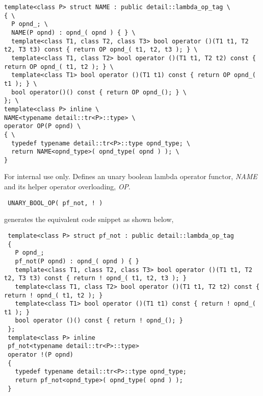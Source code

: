 \begin{Code}\begin{verbatim}template<class P> struct NAME : public detail::lambda_op_tag \
{ \
  P opnd_; \
  NAME(P opnd) : opnd_( opnd ) { } \
  template<class T1, class T2, class T3> bool operator ()(T1 t1, T2 t2, T3 t3) const { return OP opnd_( t1, t2, t3 ); } \
  template<class T1, class T2> bool operator ()(T1 t1, T2 t2) const { return OP opnd_( t1, t2 ); } \
  template<class T1> bool operator ()(T1 t1) const { return OP opnd_( t1 ); } \
  bool operator()() const { return OP opnd_(); } \
}; \
template<class P> inline \
NAME<typename detail::tr<P>::type> \
operator OP(P opnd) \
{ \
  typedef typename detail::tr<P>::type opnd_type; \
  return NAME<opnd_type>( opnd_type( opnd ) ); \
}
\end{verbatim}\end{Code}
\begin{Desc}
\item[For internal use only.]
Defines an unary boolean lambda operator functor, {\em NAME\/} and its helper operator overloading, {\em OP\/}.



\begin{Code}\begin{verbatim} UNARY_BOOL_OP( pf_not, ! ) 
\end{verbatim}\end{Code}



generates the equivalent code snippet as shown below,



\begin{Code}\begin{verbatim} template<class P> struct pf_not : public detail::lambda_op_tag
 {
   P opnd_;
   pf_not(P opnd) : opnd_( opnd ) { }
   template<class T1, class T2, class T3> bool operator ()(T1 t1, T2 t2, T3 t3) const { return ! opnd_( t1, t2, t3 ); }
   template<class T1, class T2> bool operator ()(T1 t1, T2 t2) const { return ! opnd_( t1, t2 ); }
   template<class T1> bool operator ()(T1 t1) const { return ! opnd_( t1 ); }
   bool operator ()() const { return ! opnd_(); }
 };
 template<class P> inline
 pf_not<typename detail::tr<P>::type>
 operator !(P opnd)
 {
   typedef typename detail::tr<P>::type opnd_type;
   return pf_not<opnd_type>( opnd_type( opnd ) );
 }
\end{verbatim}\end{Code}

 \end{Desc}

